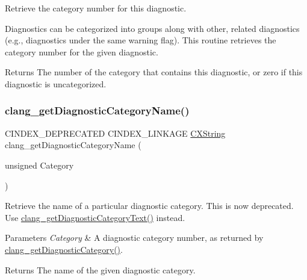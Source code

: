 Retrieve the category number for this diagnostic. 

Diagnostics can be categorized into groups along with other, related diagnostics (e.\+g., diagnostics under the same warning flag). This routine retrieves the category number for the given diagnostic.

\begin{DoxyReturn}{Returns}
The number of the category that contains this diagnostic, or zero if this diagnostic is uncategorized. 
\end{DoxyReturn}
\mbox{\label{group__CINDEX__DIAG_gaf3d608c7860a57ce6571a3b03b4ead33}} 
\subsubsection{\texorpdfstring{clang\+\_\+get\+Diagnostic\+Category\+Name()}{clang\_getDiagnosticCategoryName()}}
{\footnotesize\ttfamily C\+I\+N\+D\+E\+X\+\_\+\+D\+E\+P\+R\+E\+C\+A\+T\+ED C\+I\+N\+D\+E\+X\+\_\+\+L\+I\+N\+K\+A\+GE \mbox{\hyperlink{structCXString}{C\+X\+String}} clang\+\_\+get\+Diagnostic\+Category\+Name (\begin{DoxyParamCaption}\item[{unsigned}]{Category }\end{DoxyParamCaption})}



Retrieve the name of a particular diagnostic category. This is now deprecated. Use \mbox{\hyperlink{group__CINDEX__DIAG_ga6950702b6122f1cd74e1a369605a9f54}{clang\+\_\+get\+Diagnostic\+Category\+Text()}} instead. 


\begin{DoxyParams}{Parameters}
{\em Category} & A diagnostic category number, as returned by {\ttfamily \mbox{\hyperlink{group__CINDEX__DIAG_ga0ec085bd59b8b6c935eab0e53a1f348f}{clang\+\_\+get\+Diagnostic\+Category()}}}.\\
\hline
\end{DoxyParams}
\begin{DoxyReturn}{Returns}
The name of the given diagnostic category. 
\end{DoxyReturn}
\mbox{\label{group__CINDEX__DIAG_ga6950702b6122f1cd74e1a369605a9f54}} 
